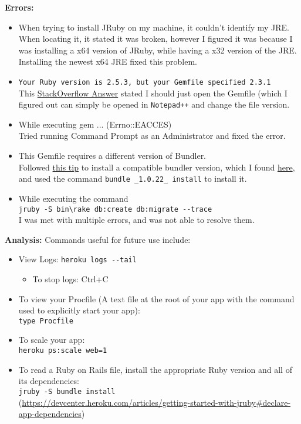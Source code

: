 \documentclass{article}
\begin{document}
\textbf{Errors:}
\begin{itemize}
    \item When trying to install JRuby on my machine, it couldn't identify my JRE. When locating it, it stated it was broken, however I figured it was because I was installing a x64 version of JRuby, while having a x32 version of the JRE. Installing the newest x64 JRE fixed this problem.
    \item \verb|Your Ruby version is 2.5.3, but your Gemfile specified 2.3.1|\\
    This \hyperlink{https://stackoverflow.com/questions/52055992/your-ruby-version-is-2-5-1-but-your-gemfile-specified-2-4-0}{StackOverflow Answer} stated I should just open the Gemfile (which I figured out can simply be opened in \verb|Notepad++| and change the file version.
    \item While executing gem ... (Errno::EACCES)\\
    Tried running Command Prompt as an Administrator and fixed the error.
    \item This Gemfile requires a different version of Bundler.\\
    Followed \hyperlink {https://stackoverflow.com/questions/12092928/how-to-bundle-install-when-your-gemfile-requires-an-older-version-of-bundler}{this tip} to install a compatible bundler version, which I found \hyperlink{https://rubygems.org/gems/bundler/versions}{here}, and used the command \verb|bundle _1.0.22_ install| to install it.
    \item While executing the command\\\verb|jruby -S bin\rake db:create db:migrate --trace|\\I was met with multiple errors, and was not able to resolve them. 
\end{itemize}
\textbf{Analysis:} Commands useful for future use include:
\begin{itemize}
    \item View Logs: \verb|heroku logs --tail|
    \begin{itemize}
        \item To stop logs: Ctrl+C
    \end{itemize}
    \item To view your Procfile (A text file at the root of your app with the command used to explicitly start your app):\\
    \verb|type Procfile|
    \item To scale your app:\\
    \verb|heroku ps:scale web=1|
    \item To read a Ruby on Rails file, install the appropriate Ruby version and all of its dependencies:\\
    \verb|jruby -S bundle install|\\
    (\url{https://devcenter.heroku.com/articles/getting-started-with-jruby\#declare-app-dependencies})
\end{itemize}
\end{document}
